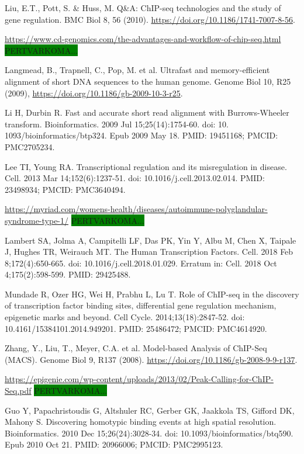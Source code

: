 \documentclass[12pt]{article}
\begin{document}
\begin{thebibliography}{99}
 Liu, E.T., Pott, S. \& Huss, M. Q\&A: ChIP-seq technologies
and the study of gene regulation. BMC Biol 8, 56 (2010).
\url{https://doi.org/10.1186/1741-7007-8-56}.

 \url{https://www.cd-genomics.com/the-advantages-and-workflow-of-chip-seq.html}
\colorbox{green}{PERTVARKOMA...}

 Langmead, B., Trapnell, C., Pop, M. et al. Ultrafast and
memory-efficient alignment of short DNA sequences to the human genome. Genome
Biol 10, R25 (2009), \newline
\url{https://doi.org/10.1186/gb-2009-10-3-r25}.

 Li H, Durbin R. Fast and accurate short read alignment with
Burrows-Wheeler transform. Bioinformatics. 2009 Jul 15;25(14):1754-60. doi: 10.
1093/bioinformatics/btp324. Epub 2009 May 18. PMID: 19451168; PMCID: PMC2705234.

 Lee TI, Young RA. Transcriptional regulation and its
misregulation in disease. Cell. 2013 Mar 14;152(6):1237-51.
doi: 10.1016/j.cell.2013.02.014. PMID: 23498934; PMCID: PMC3640494.

 \url{https://myriad.com/womens-health/diseases/autoimmune-polyglandular-syndrome-type-1/}
\colorbox{green}{PERTVARKOMA...}

 Lambert SA, Jolma A, Campitelli LF, Das PK, Yin Y, Albu M,
Chen X, Taipale J, Hughes TR, Weirauch MT. The Human Transcription Factors.
Cell. 2018 Feb 8;172(4):650-665. doi: 10.1016/j.cell.2018.01.029.
Erratum in: Cell. 2018 Oct 4;175(2):598-599. PMID: 29425488.

 Mundade R, Ozer HG, Wei H, Prabhu L, Lu T. Role of ChIP-seq
in the discovery of transcription factor binding sites, differential gene
regulation mechanism, epigenetic marks and beyond. Cell Cycle.
2014;13(18):2847-52. doi: 10.4161/15384101.2014.949201. PMID: 25486472;
PMCID: PMC4614920.

 Zhang, Y., Liu, T., Meyer, C.A. et al. Model-based Analysis
of ChIP-Seq (MACS). Genome Biol 9, R137 (2008).
\url{https://doi.org/10.1186/gb-2008-9-9-r137}.

 \url{https://epigenie.com/wp-content/uploads/2013/02/Peak-Calling-for-ChIP-Seq.pdf}
\colorbox{green}{PERTVARKOMA...}

 Guo Y, Papachristoudis G, Altshuler RC, Gerber GK, Jaakkola
TS, Gifford DK, Mahony S. Discovering homotypic binding events at high spatial
resolution. Bioinformatics. 2010 Dec 15;26(24):3028-34.
doi: 10.1093/bioinformatics/btq590. Epub 2010 Oct 21. PMID: 20966006;
PMCID: PMC2995123.


\end{thebibliography}
\end{document}
